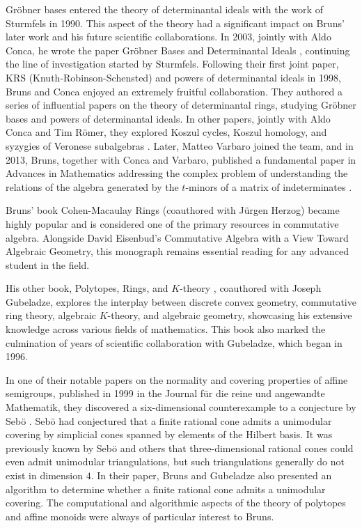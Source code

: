 \documentclass[10pt]{amsart}
\begin{document}
	Gr\"{o}bner bases entered the theory of determinantal ideals with the work of Sturmfels in 1990. This aspect of the theory had a significant impact on Bruns' later work and his future scientific collaborations. In 2003, jointly with Aldo Conca, he wrote the paper Gr\"{o}bner Bases and Determinantal Ideals \cite{BrunsConca2003}, continuing the line of investigation started by Sturmfels. Following their first joint paper, KRS (Knuth-Robinson-Schensted) and powers of determinantal ideals in 1998, Bruns and Conca enjoyed an extremely fruitful collaboration. They authored a series of influential papers on the theory of determinantal rings, studying Gr\"{o}bner bases and powers of determinantal ideals. In other papers, jointly with Aldo Conca and Tim R\"{o}mer, they explored Koszul cycles, Koszul homology, and syzygies of Veronese subalgebras \cite{BrunsConcaRoemer2011}. Later, Matteo Varbaro joined the team, and in 2013, Bruns, together with Conca and Varbaro, published a fundamental paper in Advances in Mathematics addressing the complex problem of understanding the relations of the algebra generated by the $t$-minors of a matrix of indeterminates \cite{BrunsConcaVarbaro2013}.
	
	Bruns' book Cohen-Macaulay Rings\cite{BrunsHerzog1993} (coauthored with J\"{u}rgen Herzog) became highly popular and is considered one of the primary resources in commutative algebra. Alongside David Eisenbud's Commutative Algebra with a View Toward Algebraic Geometry, this monograph remains essential reading for any advanced student in the field.
	
	His other book, Polytopes, Rings, and $K$-theory \cite{BrunsGubeladze2009}, coauthored with Joseph Gubeladze, explores the interplay between discrete convex geometry, commutative ring theory, algebraic $K$-theory, and algebraic geometry, showcasing his extensive knowledge across various fields of mathematics. This book also marked the culmination of years of scientific collaboration with Gubeladze, which began in 1996.
	
	In one of their notable papers on the normality and covering properties of affine semigroups, published in 1999 in the Journal f\"{u}r die reine und angewandte Mathematik, they discovered a six-dimensional counterexample to a conjecture by Seb\"{o} \cite{BrunsGubeladze1999}. Seb\"{o} had conjectured that a finite rational cone admits a unimodular covering by simplicial cones spanned by elements of the Hilbert basis. It was previously known by Seb\"{o} and others that three-dimensional rational cones could even admit unimodular triangulations, but such triangulations generally do not exist in dimension $4$. In their paper, Bruns and Gubeladze also presented an algorithm to determine whether a finite rational cone admits a unimodular covering. The computational and algorithmic aspects of the theory of polytopes and affine monoids were always of particular interest to Bruns.
	
\end{document}
